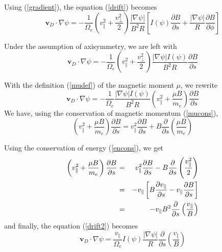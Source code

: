 Using (\ref{gradient}), the equation (\ref{drift}) becomes
\begin{equation}
\mathbf{v}_{D}\cdot \nabla \psi =-\frac{1}{\Omega _{e}}\left( v_{\Vert }^{2}+%
\frac{v_{\bot }^{2}}{2}\right) \frac{\left| \nabla \psi \right| }{B^{2}R}%
\left[ I\left( \psi \right) \frac{\partial B}{\partial s}+\frac{\left|
\nabla \psi \right| }{R}\frac{\partial B}{\partial \phi }\right]
\end{equation}

Under the assumption of axisymmetry, we are left with
\begin{equation}
\mathbf{v}_{D}\cdot \nabla \psi =-\frac{1}{\Omega _{e}}\left( v_{\Vert }^{2}+%
\frac{v_{\bot }^{2}}{2}\right) \frac{\left| \nabla \psi \right| I\left( \psi
\right) }{B^{2}R}\frac{\partial B}{\partial s}
\end{equation}

With the definition (\ref{mudef}) of the magnetic moment $\mu $, we rewrite
\begin{equation}
\mathbf{v}_{D}\cdot \nabla \psi =-\frac{1}{\Omega _{e}}\frac{\left| \nabla
\psi \right| I\left( \psi \right) }{B^{2}R}\left( v_{\Vert }^{2}+\frac{\mu B%
}{m_{e}}\right) \frac{\partial B}{\partial s}  \label{drift2}
\end{equation}
We have, using the conservation of magnetic momentum (\ref{mucons}),
\begin{equation}
\left( v_{\Vert }^{2}+\frac{\mu B}{m_{e}}\right) \frac{\partial B}{\partial s%
}=v_{\Vert }^{2}\frac{\partial B}{\partial s}+B\frac{\partial }{\partial s}%
\left( \frac{\mu B}{m_{e}}\right)
\end{equation}

Using the conservation of energy (\ref{encons}), we get
\begin{eqnarray}
\left( v_{\Vert }^{2}+\frac{\mu B}{m_{e}}\right) \frac{\partial B}{\partial s%
} &=&v_{\Vert }^{2}\frac{\partial B}{\partial s}-B\frac{\partial }{\partial s%
}\left( \frac{v_{\Vert }^{2}}{2}\right)  \\
&=&-v_{\Vert }\left[ B\frac{\partial v_{\Vert }}{\partial s}-v_{\Vert }\frac{%
\partial B}{\partial s}\right]  \\
&=&-v_{\Vert }B^{2}\frac{\partial }{\partial s}\left( \frac{v_{\Vert }}{B}%
\right)
\end{eqnarray}
and finally, the equation (\ref{drift2}) becomes
\begin{equation}
\mathbf{v}_{D}\cdot \nabla \psi =\frac{v_{\Vert }}{\Omega _{e}}I\left( \psi
\right) \frac{\left| \nabla \psi \right| }{R}\frac{\partial }{\partial s}%
\left( \frac{v_{\Vert }}{B}\right)   \label{drift3}
\end{equation}

